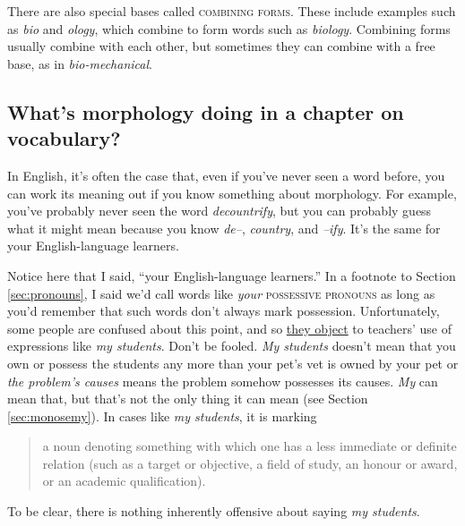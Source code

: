 There are also special bases called \textsc{combining forms}. These include examples such as \textit{bio} and \textit{ology}, which combine to form words such as \textit{biology}. Combining forms usually combine with each other, but sometimes they can combine with a free base, as in \textit{bio-mechanical}.

\subsection{What's morphology doing in a chapter on vocabulary?}

In English, it's often the case that, even if you've never seen a word before, you can work its meaning out if you know something about morphology. For example, you've probably never seen the word \textit{decountrify}, but you can probably guess what it might mean because you know \textit{de--}, \textit{country}, and \textit{--ify}. It's the same for your English-language learners.

\begin{tcolorbox}[title=Self-check, colback=white]

    Notice here that I said, ``your English-language learners.'' In a footnote to Section \ref{sec:pronouns}, I said we'd call words like \textit{your} \textsc{possessive pronouns} as long as you'd remember that such words don't always mark possession. Unfortunately, some people are confused about this point, and so \href{https://twitter.com/search?q=%22my%20students%22%20possessive&src=typed_query&f=top}{they object} to teachers' use of expressions like \textit{my students}. Don't be fooled. \textit{My students} doesn't mean that you own or possess the students any more than your pet's vet is owned by your pet or \textit{the problem's causes} means the problem somehow possesses its causes. \textit{My} can mean that, but that's not the only thing it can mean (see Section \ref{sec:monosemy}). In cases like \textit{my students}, it is marking 
    
    \begin{quote}
        a noun denoting something with which one has a less immediate or definite relation (such as a target or objective, a field of study, an honour or award, or an academic qualification).\hfill\citep{oed_my}
    \end{quote}
            
    To be clear, there is nothing inherently offensive about saying \textit{my students}.
\end{tcolorbox}

